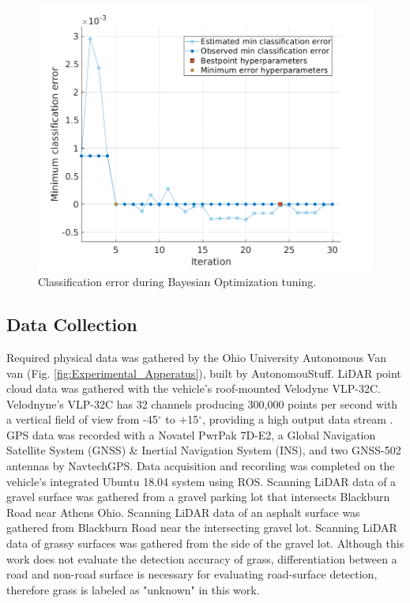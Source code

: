 \documentclass[balance,upint,subscriptcorrection,varvw,mathalfa=cal=boondoxo,colorlinks]{asmeconf}
\begin{document}
	\begin{figure}
		\centering
		\includegraphics[width=\linewidth]{figures/c2_min_class_error}
		\caption[RDF Training Classification Error]{Classification error during Bayesian Optimization tuning.}
		\label{fig:c2_min_class_error}
	\end{figure}

	
	\subsection{Data Collection}
	
	{Required physical data was gathered by the Ohio University Autonomous Van van (Fig. \ref{fig:Experimental_Apperatus}), built by AutonomouStuff. LiDAR point cloud data was gathered with the vehicle's roof-mounted Velodyne VLP-32C. Velodnyne's VLP-32C has 32 channels producing 300,000 points per second with a vertical field of view from -45$^{\circ}$ to $+$15$^{\circ}$, providing a high output data stream \cite{vlp_32c}. GPS data was recorded with a Novatel PwrPak 7D-E2, a Global Navigation Satellite System (GNSS) \& Inertial Navigation System (INS), and two GNSS-502 antennas by NavtechGPS. Data acquisition and recording was completed on the vehicle's integrated Ubuntu 18.04 system using ROS. Scanning LiDAR data of a gravel surface was gathered from a gravel parking lot that intersects Blackburn Road near Athens Ohio. Scanning LiDAR data of an asphalt surface was gathered from Blackburn Road near the intersecting gravel lot. Scanning LiDAR data of grassy surfaces was gathered from the side of the gravel lot. Although this work does not evaluate the detection accuracy of grass, differentiation between a road and non-road surface is necessary for evaluating road-surface detection, therefore grass is labeled as "unknown" in this work.}
	
\end{document}
